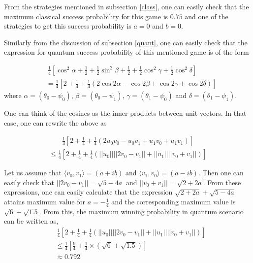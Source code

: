 \documentclass[]{svjour3}
\begin{document}

From the strategies mentioned in subsection \ref{class}, one can easily check that the maximum classical success probability for this game is $0.75$ and one of the strategies to get this success probability is $a=0$ and $b=0$.

Similarly from the discussion of subsection \ref{quant}, one can easily check that the expression for quantum success probability of this mentioned game is of the form

\begin{align*}
~ &~ \frac{1}{4}[\cos^2{\alpha} + \frac{1}{2} + \frac{1}{2} \sin^2 {\beta} + \frac{1}{2} + \frac{1}{2}\cos^2 {\gamma} + \frac{1}{2} \cos^2 {\delta}]\\
~ &= \frac{1}{4}[2 + \frac{1}{4} + \frac{1}{4}(2\cos{2\alpha} - \cos{2\beta} + \cos{2\gamma} + \cos{2\delta})]
\end{align*}
where $\alpha=(\theta_0 - \psi_0)$, $\beta=(\theta_0 - \psi_1)$, $\gamma=(\theta_1 - \psi_0)$ and 
$\delta=(\theta_1 - \psi_1)$. 

One can think of the cosines as the inner products between unit vectors. In that case, one can rewrite the above as

\begin{align*}
\frac{1}{4}[2 + \frac{1}{4} + \frac{1}{4}(2u_{0}v_{0} - u_{0}v_{1} + u_{1}v_{0} + u_{1}v_{1})]
\end{align*}
\begin{align*}
\le \frac{1}{4} \left[2 + \frac{1}{4} + \frac{1}{4}(||u_{0}|| ||2v_{0} - v_{1}|| + ||u_{1}|| ||v_{0} + v_{1}||) \right]
\end{align*}

Let us assume that $\langle v_0, v_1 \rangle = (a + ib)$ and $\langle v_1, v_0 \rangle = (a - ib)$. Then one can easily check that $||2v_0 - v_1|| = \sqrt{5 - 4a}$ and $||v_0 + v_1|| = \sqrt{2 + 2a}$. From these expressions, one can easily calculate that the expression $\sqrt{2 + 2a} + \sqrt{5 - 4a}$ attains maximum value for $a = -\frac{1}{4}$ and the corresponding maximum value is $\sqrt{6}+\sqrt{1.5}$. From this, the maximum winning probability in quantum scenario can be written as,
\begin{align*}
&~ \frac{1}{4} \left[2 + \frac{1}{4} + \frac{1}{4}(||u_{0}|| ||2v_{0} - v_{1}|| + ||u_{1}|| ||v_{0} + v_{1}||) \right]\\
&\leq \frac{1}{4} \left[\frac{9}{4} + \frac{1}{4} \times (\sqrt{6} + \sqrt{1.5})\right]\\
&\approx 0.792
\end{align*}
\end{document}
